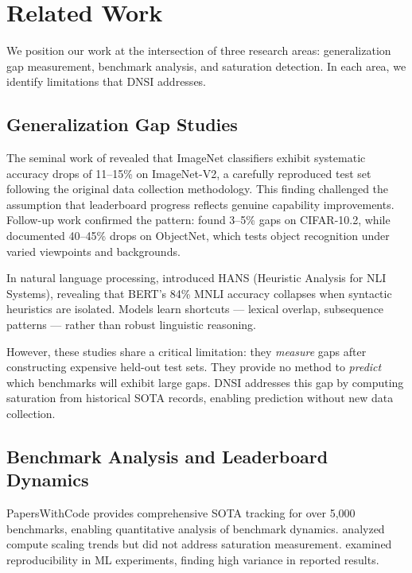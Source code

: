 \section{Related Work}
\label{sec:related}

We position our work at the intersection of three research areas: generalization gap measurement, benchmark analysis, and saturation detection. In each area, we identify limitations that DNSI addresses.

\subsection{Generalization Gap Studies}

The seminal work of \citet{recht2019imagenet} revealed that ImageNet classifiers exhibit systematic accuracy drops of 11--15\% on ImageNet-V2, a carefully reproduced test set following the original data collection methodology. This finding challenged the assumption that leaderboard progress reflects genuine capability improvements. Follow-up work confirmed the pattern: \citet{recht2019imagenet} found 3--5\% gaps on CIFAR-10.2, while \citet{barbu2019objectnet} documented 40--45\% drops on ObjectNet, which tests object recognition under varied viewpoints and backgrounds.

In natural language processing, \citet{mccoy2019right} introduced HANS (Heuristic Analysis for NLI Systems), revealing that BERT's 84\% MNLI accuracy collapses when syntactic heuristics are isolated. Models learn shortcuts --- lexical overlap, subsequence patterns --- rather than robust linguistic reasoning.

However, these studies share a critical limitation: they \emph{measure} gaps after constructing expensive held-out test sets. They provide no method to \emph{predict} which benchmarks will exhibit large gaps. DNSI addresses this gap by computing saturation from historical SOTA records, enabling prediction without new data collection.

\subsection{Benchmark Analysis and Leaderboard Dynamics}

PapersWithCode \citep{paperswithcode2020} provides comprehensive SOTA tracking for over 5,000 benchmarks, enabling quantitative analysis of benchmark dynamics. \citet{thompson2020computational} analyzed compute scaling trends but did not address saturation measurement. \citet{bouthillier2021accounting} examined reproducibility in ML experiments, finding high variance in reported results.

